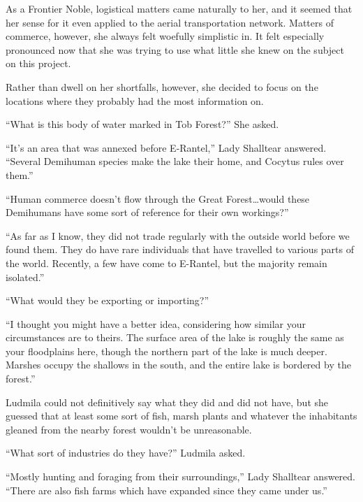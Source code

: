  

As a Frontier Noble, logistical matters came naturally to her, and it seemed that her sense for it even applied to the aerial transportation network. Matters of commerce, however, she always felt woefully simplistic in. It felt especially pronounced now that she was trying to use what little she knew on the subject on this project.

 

Rather than dwell on her shortfalls, however, she decided to focus on the locations where they probably had the most information on.

 

“What is this body of water marked in Tob Forest?” She asked.

 

“It’s an area that was annexed before E-Rantel,” Lady Shalltear answered. “Several Demihuman species make the lake their home, and Cocytus rules over them.”

 

“Human commerce doesn’t flow through the Great Forest…would these Demihumans have some sort of reference for their own workings?”

 

“As far as I know, they did not trade regularly with the outside world before we found them. They do have rare individuals that have travelled to various parts of the world. Recently, a few have come to E-Rantel, but the majority remain isolated.”

 

“What would they be exporting or importing?”

 

“I thought you might have a better idea, considering how similar your circumstances are to theirs. The surface area of the lake is roughly the same as your floodplains here, though the northern part of the lake is much deeper. Marshes occupy the shallows in the south, and the entire lake is bordered by the forest.”

 

Ludmila could not definitively say what they did and did not have, but she guessed that at least some sort of fish, marsh plants and whatever the inhabitants gleaned from the nearby forest wouldn’t be unreasonable.

 

“What sort of industries do they have?” Ludmila asked.

 

“Mostly hunting and foraging from their surroundings,” Lady Shalltear answered. “There are also fish farms which have expanded since they came under us.”

